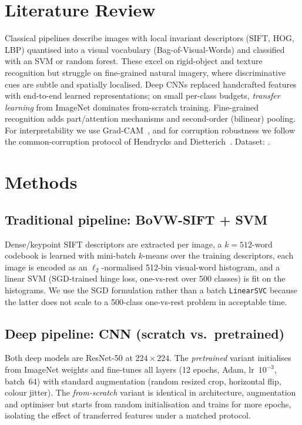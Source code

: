 \documentclass[10pt,twocolumn,letterpaper]{article}
\begin{document}
\section{Literature Review}\label{sec:lit}
Classical pipelines describe images with local invariant descriptors (SIFT, HOG, LBP)
quantised into a visual vocabulary (Bag-of-Visual-Words) and classified with an SVM or
random forest. These excel on rigid-object and texture recognition but struggle on
fine-grained natural imagery, where discriminative cues are subtle and spatially
localised. Deep CNNs replaced handcrafted features with end-to-end learned
representations; on small per-class budgets, \emph{transfer learning} from ImageNet
dominates from-scratch training. Fine-grained recognition adds part/attention
mechanisms and second-order (bilinear) pooling. For interpretability we use
Grad-CAM~\cite{gradcam}, and for corruption robustness we follow the common-corruption
protocol of Hendrycks and Dietterich~\cite{hendrycks}. Dataset: \cite{inat2021}.

\section{Methods}\label{sec:methods}
\subsection{Traditional pipeline: BoVW-SIFT + SVM}
Dense/keypoint SIFT descriptors are extracted per image, a $k{=}512$-word codebook is
learned with mini-batch $k$-means over the training descriptors, each image is encoded
as an $\ell_2$-normalised 512-bin visual-word histogram, and a linear SVM
(SGD-trained hinge loss, one-vs-rest over 500 classes) is fit on the histograms.
We use the SGD formulation rather than a batch \texttt{LinearSVC} because the latter
does not scale to a 500-class one-vs-rest problem in acceptable time.

\subsection{Deep pipeline: CNN (scratch vs.\ pretrained)}
Both deep models are ResNet-50 at $224{\times}224$. The \emph{pretrained} variant
initialises from ImageNet weights and fine-tunes all layers (12 epochs, Adam,
lr~$10^{-3}$, batch~64) with standard augmentation (random resized crop, horizontal
flip, colour jitter). The \emph{from-scratch} variant is identical in architecture,
augmentation and optimiser but starts from random initialisation and trains for more
epochs, isolating the effect of transferred features under a matched protocol.
\end{document}
